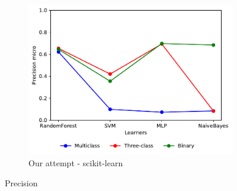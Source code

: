 \begin{figure}[H]
\begin{subfigure}[t]{0.4\textwidth}
        \includegraphics[width=\linewidth, page = 2]{images/precision}
        \caption{Our attempt - scikit-learn}
    \end{subfigure}
    \caption{Precision}
    \label{fig:prec}
\end{figure}

